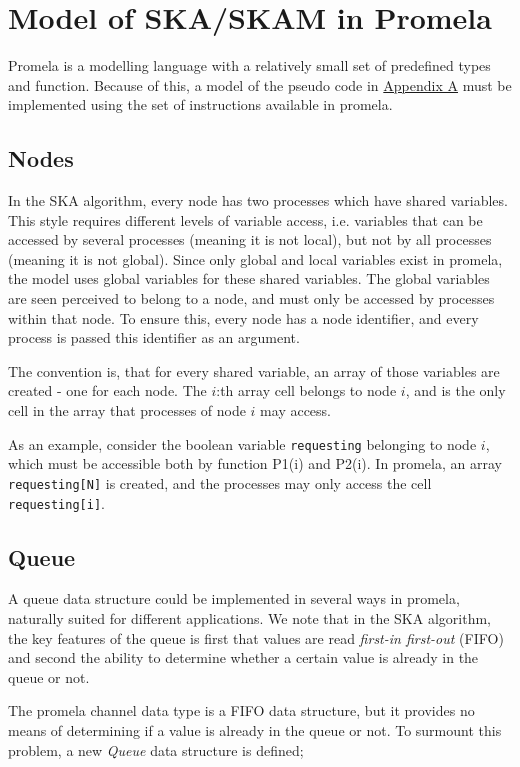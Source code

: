 \documentclass[a4paper,12pt]{article}
\begin{document}
\section{Model of SKA/SKAM in Promela}
Promela is a modelling language with a relatively small set of predefined types and function. Because of this, a model of the pseudo code in \hyperref[sec:SKA]{Appendix A} must be implemented using the set of instructions available in promela.


\subsection{Nodes}
In the SKA algorithm, every node has two processes which have shared variables. This style requires different levels of variable access, i.e. variables that can be accessed by several processes (meaning it is not local), but not by all processes (meaning it is not global). Since only global and local variables exist in promela, the model uses global variables for these shared variables. The global variables are seen perceived to belong to a node, and must only be accessed by processes within that node. To ensure this, every node has a node identifier, and every process is passed this identifier as an argument. 

The convention is, that for every shared variable, an array of those variables are created - one for each node. The $i$:th array cell belongs to node $i$, and is the only cell in the array that processes of node $i$ may access.

As an example, consider the boolean variable \texttt{requesting} belonging to node $i$, which must be accessible both by function P1(i) and P2(i). In promela, an array \texttt{requesting[N]} is created, and the processes may only access the cell \texttt{requesting[i]}.

\subsection{Queue}
A queue data structure could be implemented in several ways in promela, naturally suited for different applications. We note that in the SKA algorithm, the key features of the queue is first that values are read \emph{first-in first-out} (FIFO) and second the ability to determine whether a certain value is already in the queue or not.

The promela channel data type is a FIFO data structure, but it provides no means of determining if a value is already in the queue or not. To surmount this problem, a new \emph{Queue} data structure is defined;
\end{document}
